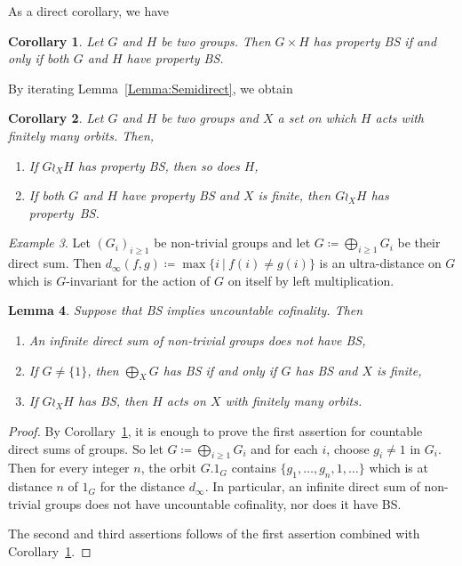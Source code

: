 \documentclass[a4paper]{article}
\newtheorem{lem}{Lemma}[section]
\newtheorem{cor}[lem]{Corollary}
\theoremstyle{definition}
\theoremstyle{remark}%
\newtheorem{exmp}[lem]{Example}
\newcommand{\setst}[2]{\{#1\ |\ #2\}}
\begin{document}
%
%
As a direct corollary, we have
\begin{cor}\label{Cor:Prod}
Let $G$ and $H$ be two groups. Then $G\times H$ has property BS if and only if both $G$ and $H$ have property BS.
\end{cor}
%
%
By iterating Lemma~\ref{Lemma:Semidirect}, we obtain
%
%
\begin{cor}\label{Cor:Wreath}
Let $G$ and $H$ be two groups and $X$ a set on which $H$ acts with finitely many orbits. Then,
\begin{enumerate}
\item
If $G\wr_X H$ has property BS, then so does $H$,
\item
If both $G$ and $H$ have property BS and $X$ is finite, then $G\wr_X H$ has property~BS.
\end{enumerate}
\end{cor}
%
%
\begin{exmp}
Let $(G_i)_{i\geq 1}$ be non-trivial groups and let $G\coloneqq\bigoplus_{i\geq 1} G_i$ be their direct sum.
Then $d_\infty(f,g)\coloneqq\max\setst{i}{f(i)\neq g(i)}$ is an ultra-distance on $G$ which is $G$-invariant for the action of $G$ on itself by left multiplication.
\end{exmp}
%
%
\begin{lem}\label{Lemma:Cof}
Suppose that BS implies uncountable cofinality. Then
\begin{enumerate}
\item An infinite direct sum of non-trivial groups does not have BS,
\item If $G\neq\{1\}$, then $\bigoplus_XG$ has BS if and only if $G$ has BS and $X$ is finite,
\item If $G\wr_XH$ has BS, then $H$ acts on $X$ with finitely many orbits.
\end{enumerate}
\end{lem}
\begin{proof}
By Corollary~\ref{Cor:Prod}, it is enough to prove the first assertion for countable direct sums of groups.
So let $G\coloneqq \bigoplus_{i\geq 1}G_i$ and for each $i$, choose $g_i\neq 1$ in $G_i$. Then for every integer $n$, the orbit $G.1_G$ contains $\{g_1,\dots,g_n,1,\dots\}$ which is at distance $n$ of $1_G$ for the distance $d_\infty$.
In particular, an infinite direct sum of non-trivial groups does not have uncountable cofinality, nor does it have BS.

The second and third assertions follows of the first assertion combined with Corollary~\ref{Cor:Prod}. 
\end{proof}
\end{document}

